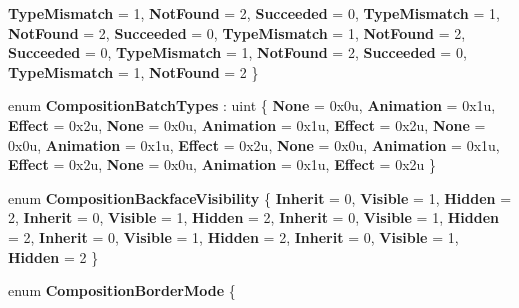 \begin{DoxyCompactItemize}
{\bfseries Type\+Mismatch} = 1, 
{\bfseries Not\+Found} = 2, 
{\bfseries Succeeded} = 0, 
\newline
{\bfseries Type\+Mismatch} = 1, 
{\bfseries Not\+Found} = 2, 
{\bfseries Succeeded} = 0, 
{\bfseries Type\+Mismatch} = 1, 
\newline
{\bfseries Not\+Found} = 2, 
{\bfseries Succeeded} = 0, 
{\bfseries Type\+Mismatch} = 1, 
{\bfseries Not\+Found} = 2, 
\newline
{\bfseries Succeeded} = 0, 
{\bfseries Type\+Mismatch} = 1, 
{\bfseries Not\+Found} = 2
 \}
\item 
\mbox{\label{namespace_windows_1_1_u_i_1_1_composition_aee18d765e5fb2f69e4c1656c628cd576}} 
enum {\bfseries Composition\+Batch\+Types} \+: uint \{ \newline
{\bfseries None} = 0x0u, 
{\bfseries Animation} = 0x1u, 
{\bfseries Effect} = 0x2u, 
{\bfseries None} = 0x0u, 
\newline
{\bfseries Animation} = 0x1u, 
{\bfseries Effect} = 0x2u, 
{\bfseries None} = 0x0u, 
{\bfseries Animation} = 0x1u, 
\newline
{\bfseries Effect} = 0x2u, 
{\bfseries None} = 0x0u, 
{\bfseries Animation} = 0x1u, 
{\bfseries Effect} = 0x2u, 
\newline
{\bfseries None} = 0x0u, 
{\bfseries Animation} = 0x1u, 
{\bfseries Effect} = 0x2u
 \}
\item 
\mbox{\label{namespace_windows_1_1_u_i_1_1_composition_a2208fe30c093609e4c2f6f06851913d2}} 
enum {\bfseries Composition\+Backface\+Visibility} \{ \newline
{\bfseries Inherit} = 0, 
{\bfseries Visible} = 1, 
{\bfseries Hidden} = 2, 
{\bfseries Inherit} = 0, 
\newline
{\bfseries Visible} = 1, 
{\bfseries Hidden} = 2, 
{\bfseries Inherit} = 0, 
{\bfseries Visible} = 1, 
\newline
{\bfseries Hidden} = 2, 
{\bfseries Inherit} = 0, 
{\bfseries Visible} = 1, 
{\bfseries Hidden} = 2, 
\newline
{\bfseries Inherit} = 0, 
{\bfseries Visible} = 1, 
{\bfseries Hidden} = 2
 \}
\item 
\mbox{\label{namespace_windows_1_1_u_i_1_1_composition_ad094aac2d72715708083e1a34f7835f0}} 
enum {\bfseries Composition\+Border\+Mode} \{ \newline

\end{DoxyCompactItemize}
